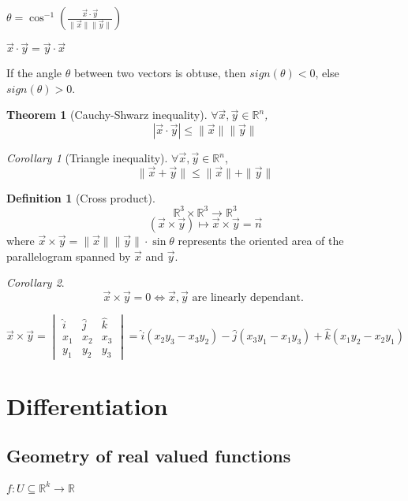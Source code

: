 \documentclass[12pt]{book}
\newtheorem{theorem}{Theorem}[section]
\theoremstyle{definition}
\newtheorem{definition}{Definition}[section]
\theoremstyle{remark}
\newtheorem{corollary}{Corollary}[theorem]
\begin{document}
\begin{note} $\theta = \cos^{-1} \left(  \frac{\vec{{x}} \cdot \vec{{y}}}{\|\vec{{x}} \| \|\vec{{y}} \| } \right)$
  
\end{note}
\begin{note}
  $ \vec{{x}} \cdot \vec{{y}} = \vec{{y}} \cdot {\vec{{x}} {}}$
\end{note}
\begin{note} 
  If the angle $\theta$  between two vectors is obtuse, then $sign(\theta) < 0$, else $sign(\theta)>0$. 
\end{note}
\begin{theorem} [Cauchy-Shwarz inequality] \label{Cauchy-Shwarz}
  $\forall \vec{{x}}, \vec{{y}} \in \mathbb{R}^n$, 
  $$|\vec{{x}} \cdot \vec{{y}}| \leq \|\vec{{x}} \| \| \vec{{y}} \|
$$
\end{theorem}
\begin{corollary} [Triangle inequality]
  $\forall \vec{{x}} , \vec{{y}} \in \mathbb{R}^n $,
  $$\|\vec{{x}} + \vec{{y}} \| \leq \| \vec{{x}} \| + \| \vec{{y}} \| $$
\end{corollary}
\begin{definition}[Cross product]
  $$\mathbb{R}^3 \times \mathbb{R}^3 \rightarrow \mathbb{R}^3$$
    $$(\vec{{x}} \times \vec{{y}} ) \mapsto \vec{{x}} \times \vec{{y}} = \vec{{n}} $$
    where $\vec{{x}} \times \vec{{y}} = \| \vec{{x}} \| \| \vec{{y}} \| \cdot \sin \theta $ represents the oriented area of the parallelogram spanned by $\vec{{x}}$ and $\vec{{y}}$.  
\end{definition}
\begin{corollary}
  $$ \vec{{x}} \times \vec{{y}} = 0 \iff \vec{{x}}, \vec{{y}} \text{ are linearly dependant. } $$
\end{corollary}
\begin{note} 
  $$\vec{{x}} \times \vec{{y}} = \begin{vmatrix}
    \hat{i} & \hat{j} & \hat{k} \\ 
    x_1 & x_2 & x_3 \\ 
    y_1 & y_2 & y_3 
  \end{vmatrix}  = \hat{i} (x_2y_3 - x_3 y_2) - \hat{j} (x_3 y_1-x_1 y_3 ) + \hat{k} (x_1 y_2 - x_2y_1) $$   
\end{note}

\chapter{Differentiation}
\section{Geometry of real valued functions}%
  \label{sub:Name}
  $f : U \subseteq \mathbb{R}^k \rightarrow \mathbb{R}$
\end{document}

